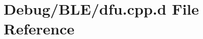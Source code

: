 \hypertarget{_debug_2_b_l_e_2dfu_8cpp_8d}{\section{\-Debug/\-B\-L\-E/dfu.cpp.\-d \-File \-Reference}
\label{_debug_2_b_l_e_2dfu_8cpp_8d}
}
